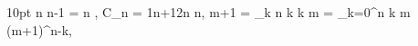  10pt
\baselineskip=28pt
\Fm \Subset n {n-1} = {n }, \Mf
\Fm C_n = {1\over n+1}{2n \choose n}, \Mf
\Fm {} {m+1} = \sum_k {n \choose k} \Subset k m = \sum_{k=0}^n \Subset k m (m+1)^{n-k}, \Mf
\EndDis
